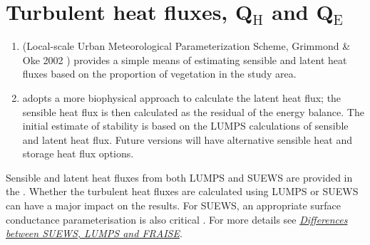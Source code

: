 \documentclass[letterpaper,10pt,english]{sphinxmanual}
\begin{document}
\section{Turbulent heat fluxes, Q$_{\text{H}}$ and Q$_{\text{E}}$}
\label{\detokenize{parameterisations-and-sub-models:turbulent-heat-fluxes-qh-and-qe}}\begin{enumerate}
\item {} 
 (Local-scale Urban Meteorological Parameterization Scheme,
Grimmond \& Oke 2002 \label{\detokenize{parameterisations-and-sub-models:id13}}{\hyperref[\detokenize{references:go2002}]{\sphinxcrossref{{[}GO2002{]}}}}) provides a simple means of estimating
sensible and latent heat fluxes based on the proportion of vegetation
in the study area.

\item {} 
 adopts a more biophysical approach to calculate the latent
heat flux; the sensible heat flux is then calculated as the residual
of the energy balance. The initial estimate of stability is based on
the LUMPS calculations of sensible and latent heat flux. Future
versions will have alternative sensible heat and storage heat flux
options.

\end{enumerate}

Sensible and latent heat fluxes from both LUMPS and SUEWS are provided
in the {\hyperref[\detokenize{output_files/output_files:output-files}]{}}. Whether the turbulent heat
fluxes are calculated using LUMPS or SUEWS can have a major impact on
the results. For SUEWS, an appropriate surface conductance
parameterisation is also critical \label{\detokenize{parameterisations-and-sub-models:id14}}{\hyperref[\detokenize{references:j11}]{\sphinxcrossref{{[}J11{]}}}} \label{\detokenize{parameterisations-and-sub-models:id15}}{\hyperref[\detokenize{references:w16}]{\sphinxcrossref{{[}W16{]}}}}. For more details see
{\hyperref[\detokenize{parameterisations-and-sub-models:Differences_between_SUEWS,_LUMPS_and_FRAISE}]{\emph{Differences between SUEWS, LUMPS and
FRAISE}}}.
\end{document}
